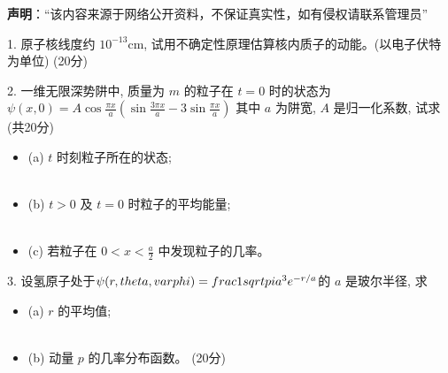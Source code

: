 
\textbf{声明}：“该内容来源于网络公开资料，不保证真实性，如有侵权请联系管理员”

1. 原子核线度约 $10^{-13} \text{cm}$, 试用不确定性原理估算核内质子的动能。(以电子伏特为单位)  (20分)

2. 一维无限深势阱中, 质量为 $m$ 的粒子在 $t=0$ 时的状态为 
$\psi(x,0) = A \cos \frac{\pi x}{a} \left( \sin \frac{3 \pi x}{a} - 3 \sin \frac{\pi x}{a} \right)$
其中 $a$ 为阱宽, $A$ 是归一化系数, 试求 (共20分) 
\begin{itemize}
\item  (a) $t$ 时刻粒子所在的状态; \\\\
\item  (b) $t>0$ 及 $t=0$ 时粒子的平均能量; \\\\
\item  (c) 若粒子在 $0 < x < \frac{a}{2}$ 中发现粒子的几率。\\
\end{itemize}
3. 设氢原子处于$\psi(r, \\theta, \\varphi) = \\frac{1}{\\sqrt{\\pi a^3}} e^{-r/a}$的 $a$ 是玻尔半径, 求 
\begin{itemize}
\item (a) $r$ 的平均值; \\\\
\item  (b) 动量 $p$ 的几率分布函数。  (20分)
\end{itemize}

